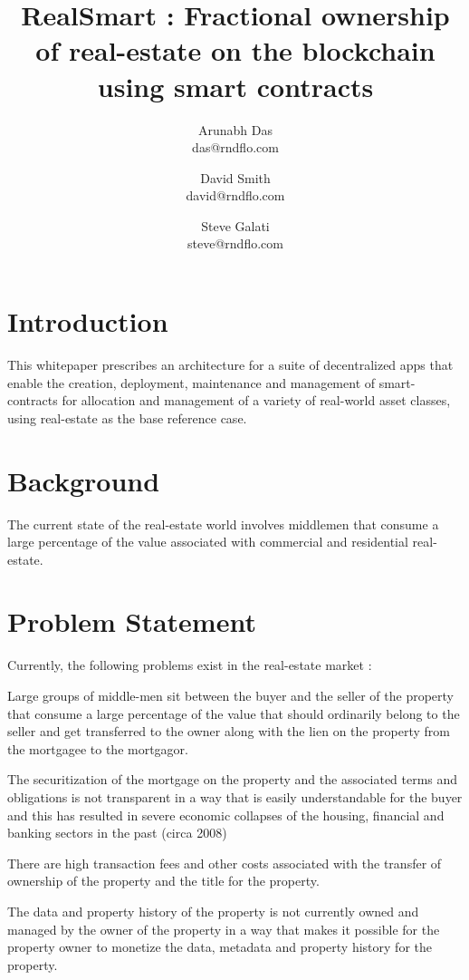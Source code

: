 \documentclass{article}
\author{Arunabh Das \\ {das@rndflo.com}
   \and David Smith \\ {david@rndflo.com} 
   \and Steve Galati \\ {steve@rndflo.com} }
\title{RealSmart : Fractional ownership of real-estate on the blockchain using smart contracts}
\date{\vspace{-5ex}}
\begin{document}
\maketitle

\section{Introduction}


This whitepaper prescribes an architecture for a suite of decentralized apps that enable the creation, 
deployment, maintenance and management of smart-contracts for allocation and management of a variety 
of real-world asset classes, using real-estate as the base reference case.




\section{Background}


The current state of the real-estate world involves middlemen that consume a large percentage of the 
value associated with commercial and residential real-estate.

\section{Problem Statement}


Currently, the following problems exist in the real-estate market :

Large groups of middle-men sit between the buyer and the seller of the property that consume a large 
percentage of the value that should ordinarily belong to the seller and get transferred to the owner 
along with the lien on the property from the mortgagee to the mortgagor.


The securitization of the mortgage on the property and the associated terms and obligations is not 
transparent in a way that is easily understandable for the buyer and this has resulted in severe 
economic collapses of the housing, financial and banking sectors in the past (circa 2008)


There are high transaction fees and other costs associated with the transfer of ownership of the property 
and the title for the property.


The data and property history of the property is not currently owned and managed by the owner of the 
property in a way that makes it possible for the property owner to monetize the data, metadata and property history for the property.
\end{document}
